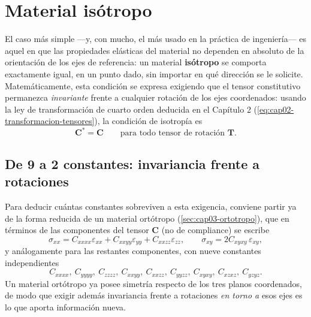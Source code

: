 \section{Material isótropo}
\label{sec:cap03-isotropo}

El caso más simple —y, con mucho, el más usado en la práctica de ingeniería— es aquel en que las propiedades elásticas del material no dependen en absoluto de la orientación de los ejes de referencia: un material \textbf{isótropo} se comporta exactamente igual, en un punto dado, sin importar en qué dirección se le solicite. Matemáticamente, esta condición se expresa exigiendo que el tensor constitutivo permanezca \emph{invariante} frente a cualquier rotación de los ejes coordenados: usando la ley de transformación de cuarto orden deducida en el Capítulo 2 (\cref{eq:cap02-transformacion-tensores}), la condición de isotropía es
\[
\bm C^{*} = \bm C \qquad \text{para todo tensor de rotación } \bm T.
\]

\subsection{De 9 a 2 constantes: invariancia frente a rotaciones}

Para deducir cuántas constantes sobreviven a esta exigencia, conviene partir ya de la forma reducida de un material ortótropo (\cref{sec:cap03-ortotropo}), que en términos de las componentes del tensor $\bm C$ (no de compliance) se escribe
\[
\sigma_{xx} = C_{xxxx}\varepsilon_{xx} + C_{xxyy}\varepsilon_{yy} + C_{xxzz}\varepsilon_{zz}, \qquad
\sigma_{xy} = 2C_{xyxy}\,\varepsilon_{xy},
\]
y análogamente para las restantes componentes, con nueve constantes independientes
\[
C_{xxxx},\ C_{yyyy},\ C_{zzzz},\ C_{xxyy},\ C_{xxzz},\ C_{yyzz},\ C_{xyxy},\ C_{xzxz},\ C_{yzyz}.
\]
Un material ortótropo ya posee simetría respecto de los tres planos coordenados, de modo que exigir además invariancia frente a rotaciones \emph{en torno a} esos ejes es lo que aporta información nueva.

